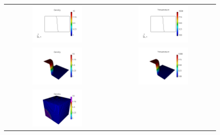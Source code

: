 \documentclass[review]{elsarticle}
\begin{document}
\begin{figure}[tbh]
  \begin{center}
    \begin{tabular}{cc}
      \includegraphics[width=0.5\textwidth]{figs/density_p71D.png} &
      \includegraphics[width=0.5\textwidth]{figs/temperature_p71D.png} \\
      \includegraphics[width=0.5\textwidth]{figs/density_p72D.png} &
      \includegraphics[width=0.5\textwidth]{figs/temperature_p72D.png} \\
      \includegraphics[width=0.5\textwidth]{figs/density_p73D.png} &

\end{tabular}
\end{center}
\end{figure}
\end{document}
